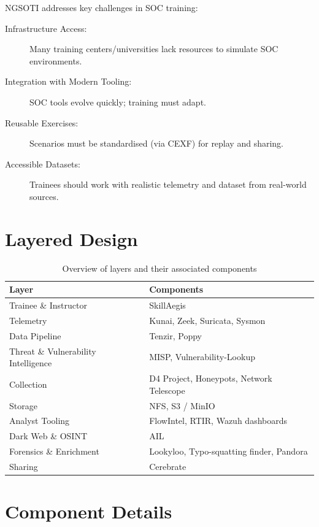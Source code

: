 \documentclass[10pt,a4paper]{report}
\begin{document}
NGSOTI addresses key challenges in SOC training:

\begin{description}
    \item [Infrastructure Access:] Many training centers/universities lack
          resources to simulate SOC environments.
    \item [Integration with Modern Tooling:] SOC tools evolve quickly; training
          must adapt.
    \item [Reusable Exercises:] Scenarios must be standardised (via CEXF) for
          replay and sharing.
    \item [Accessible Datasets:] Trainees should work with realistic telemetry
          and dataset from real-world sources.
\end{description}

\section{Layered Design}

\begin{table}[h!]
\centering
\begin{tabularx}{\textwidth}{|l|X|}
\hline
\textbf{Layer} & \textbf{Components} \\
\hline
Trainee \& Instructor & SkillAegis \\
\hline
Telemetry & Kunai, Zeek, Suricata, Sysmon \\
\hline
Data Pipeline & Tenzir, Poppy \\
\hline
Threat \& Vulnerability Intelligence & MISP, Vulnerability-Lookup \\
\hline
Collection & D4 Project, Honeypots, Network Telescope \\
\hline
Storage & NFS, S3 / MinIO \\
\hline
Analyst Tooling & FlowIntel, RTIR, Wazuh dashboards \\
\hline
Dark Web \& OSINT & AIL \\
\hline
Forensics \& Enrichment & Lookyloo, Typo-squatting finder, Pandora \\
\hline
Sharing & Cerebrate \\
\hline
\end{tabularx}
\caption{Overview of layers and their associated components}
\label{tab:layers-components}
\end{table}

\section{Component Details}
\end{document}
